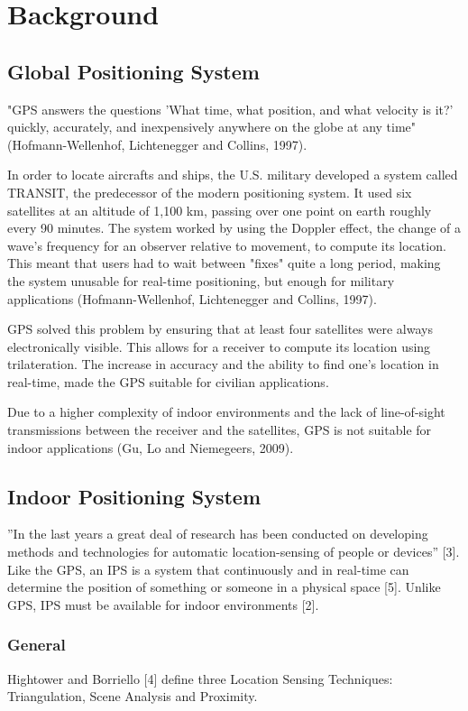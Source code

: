 \chapter{Background}

\section{Global Positioning System}
"GPS answers the questions 'What time, what position, and what velocity is it?' quickly, accurately, and inexpensively anywhere on the globe at any time" (Hofmann-Wellenhof, Lichtenegger and Collins, 1997).  

In order to locate aircrafts and ships, the U.S. military developed a system called TRANSIT, the predecessor of the modern positioning system. It used six satellites at an altitude of 1,100 km, passing over one point on earth roughly every 90 minutes. The system worked by using the Doppler effect, the change of a wave's frequency for an observer relative to movement, to compute its location. This meant that users had to wait between "fixes" quite a long period, making the system unusable for real-time positioning, but enough for military applications (Hofmann-Wellenhof, Lichtenegger and Collins, 1997). 

GPS solved this problem by ensuring that at least four satellites were always electronically visible. This allows for a receiver to compute its location using trilateration. The increase in accuracy and the ability to find one’s location in real-time, made the GPS suitable for civilian applications. 

Due to a higher complexity of indoor environments and the lack of line-of-sight transmissions between the receiver and the satellites, GPS is not suitable for indoor applications (Gu, Lo and Niemegeers, 2009).

\section{Indoor Positioning System}
”In the last years a great deal of research has been conducted on developing methods and technologies for automatic location-sensing of people or devices” [3]. Like the GPS, an IPS is a system that continuously and in real-time can determine the position of something or someone in a physical space [5]. Unlike GPS, IPS must be available for indoor environments [2]. 

\subsection{General}
Hightower and Borriello [4] define three Location Sensing Techniques: Triangulation, Scene Analysis and Proximity. 

